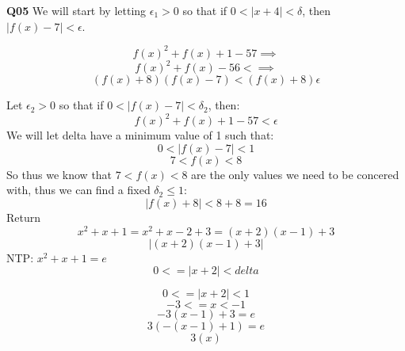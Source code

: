 \documentclass[11pt]{article}
\begin{document}
\parindent=0pt

\textbf{Q05} We will start by letting $\epsilon_1 >0$ so that if $0 < |x+4| < \delta$, then $|f(x)-7|<\epsilon$.

\[ f(x)^2 + f(x) + 1 -57 \implies \]
\[ f(x)^2 + f(x) -56 < \implies\]
\[ (f(x)+ 8)(f(x) - 7) < (f(x)+ 8) \epsilon\]


 Let $\epsilon_2 >0$ so that if $0 < |f(x)-7| < \delta_2$, then:
\[  f(x)^2 + f(x) + 1 -57  < \epsilon \]
We will let delta have a minimum value of 1 such that:
\[ 0 < |f(x)-7| < 1 \]
\[ 7 < f(x) < 8 \]
So thus we know that $7 < f(x) < 8$ are the only values we need to be concered with, thus we can find a fixed $\delta_2 \leq 1$:
\[ |f(x) + 8| < 8 + 8 = 16 \]
Return
\[ x^2 + x + 1 = x^2 + x -2 + 3 = (x + 2)(x-1) + 3 \]
\[ |(x+2)(x-1) + 3| \]
NTP: $x^2  + x + 1 = e$
\[ 0 <= |x+2| < delta \]

\[ 0 <= |x+2| < 1 \]
\[ -3 <= x < -1 \]
\[-3(x-1) + 3 = e\]
\[3(-(x-1) + 1) = e\]
\[3(x)\]
\end{document}
